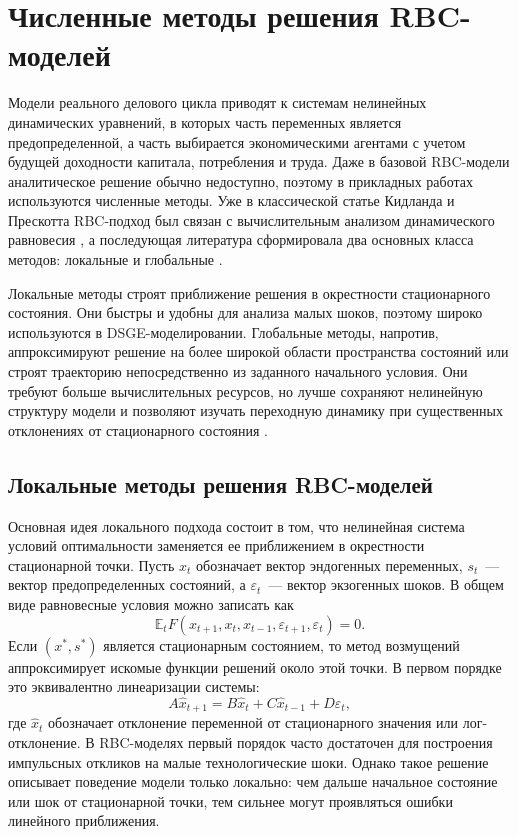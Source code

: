\chapter{Численные методы решения RBC-моделей}

Модели реального делового цикла приводят к системам нелинейных динамических
уравнений, в которых часть переменных является предопределенной, а часть
выбирается экономическими агентами с учетом будущей доходности капитала,
потребления и труда. Даже в базовой RBC-модели аналитическое решение обычно
недоступно, поэтому в прикладных работах используются численные методы. Уже в
классической статье Кидланда и Прескотта RBC-подход был связан с вычислительным
анализом динамического равновесия \cite{kydland1982time}, а последующая
литература сформировала два основных класса методов: локальные и глобальные
\cite{judd1998numerical, fernandez2015solution}.

Локальные методы строят приближение решения в окрестности стационарного
состояния. Они быстры и удобны для анализа малых шоков, поэтому широко
используются в DSGE-моделировании. Глобальные методы, напротив, аппроксимируют
решение на более широкой области пространства состояний или строят траекторию
непосредственно из заданного начального условия. Они требуют больше
вычислительных ресурсов, но лучше сохраняют нелинейную структуру модели и
позволяют изучать переходную динамику при существенных отклонениях от
стационарного состояния \cite{tayloruhlig1990solving, aruoba2006comparing}.

\section{Локальные методы решения RBC-моделей}

Основная идея локального подхода состоит в том, что нелинейная система условий
оптимальности заменяется ее приближением в окрестности стационарной точки. Пусть
$x_t$ обозначает вектор эндогенных переменных, $s_t$~--- вектор
предопределенных состояний, а $\varepsilon_t$~--- вектор экзогенных шоков. В
общем виде равновесные условия можно записать как
\[
    \mathbb{E}_t F(x_{t+1},x_t,x_{t-1},\varepsilon_{t+1},\varepsilon_t)=0.
\]
Если $(x^*,s^*)$ является стационарным состоянием, то метод возмущений
аппроксимирует искомые функции решений около этой точки. В первом порядке это
эквивалентно линеаризации системы:
\[
    A \widehat{x}_{t+1}
    =
    B \widehat{x}_t
    +
    C \widehat{x}_{t-1}
    +
    D \varepsilon_t,
\]
где $\widehat{x}_t$ обозначает отклонение переменной от стационарного значения
или лог-отклонение. В RBC-моделях первый порядок часто достаточен для построения
импульсных откликов на малые технологические шоки. Однако такое решение
описывает поведение модели только локально: чем дальше начальное состояние или
шок от стационарной точки, тем сильнее могут проявляться ошибки линейного
приближения.

